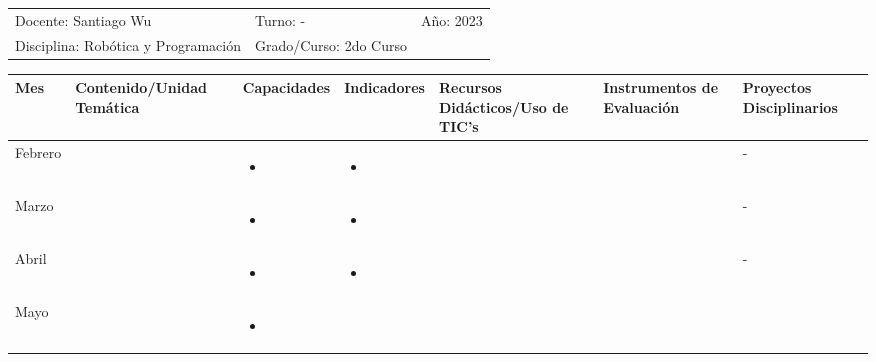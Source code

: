 \documentclass[landscape, a4paper, 10pt]{article}
\newcommand{\smallcellwidth}{0.7in}
\newcommand{\normalcellwidth}{1.2in}
\newcommand{\bigcellwidth}{2.0in}
\newcommand{\profesor}{Santiago Wu}
\newcommand{\discipline}{Robótica y Programación}
\newcommand{\currentyear}{2023}
\begin{document}
	\begin{tabularx}{\textwidth}{ >{\raggedright\arraybackslash}X >{\raggedright\arraybackslash}X >{\raggedright\arraybackslash}X }
		Docente: \profesor &
		Turno: - &
		Año: \currentyear \\
		Disciplina: \discipline &
		Grado/Curso: 2do Curso &
		 \\
	\end{tabularx}
	\centering
	\begin{longtable}{|m{\smallcellwidth}|p{\normalcellwidth}|p{\bigcellwidth}|p{\bigcellwidth}|p{\normalcellwidth}|p{\normalcellwidth}|p{\normalcellwidth}|}
		\hline
		\textbf{Mes} &
		\textbf{Contenido/Unidad Temática} &
		\textbf{Capacidades} &
		\textbf{Indicadores} &
		\textbf{Recursos Didácticos/Uso de TIC's} &
		\textbf{Instrumentos de Evaluación} &
		\textbf{Proyectos Disciplinarios} \\
		\hline
		\endhead
		Febrero &
		 &
		\begin{itemize}
			\item 
		\end{itemize} &
		\begin{itemize}
			\item 
		\end{itemize} &
		  &
		  &
		 - \\
		\hline
		Marzo &
		 &
		\begin{itemize}
			\item 
		\end{itemize} &
		\begin{itemize}
			\item 
		\end{itemize} &
		  &
		  &
		 - \\
		\hline
		Abril &
		 &
		\begin{itemize}
			\item 
		\end{itemize} &
		\begin{itemize}
			\item 
		\end{itemize} &
		  &
		  &
		 - \\
		\hline
		Mayo &
		 &
		\begin{itemize}
			\item 
		\end{itemize} &
		\begin{itemize}

\end{itemize}
\end{longtable}
\end{document}

